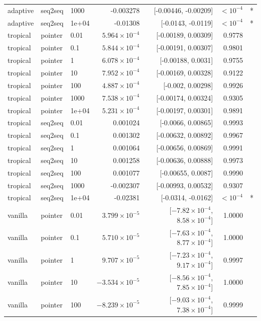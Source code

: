 \documentclass[10pt]{article}
\begin{document}
{\begin{longtable}{lllrrrl}
adaptive & seq2seq & 1000 & -0.003278 & [-0.00446, -0.00209] & $<10^{-4}$ & *\\
adaptive & seq2seq & 1e+04 & -0.01308 & [-0.0143, -0.0119] & $<10^{-4}$ & *\\
tropical & pointer & 0.01 & $5.964\times10^{-4}$ & [-0.00189, 0.00309] & 0.9778 & \\
tropical & pointer & 0.1 & $5.844\times10^{-4}$ & [-0.00191, 0.00307] & 0.9801 & \\
tropical & pointer & 1 & $6.078\times10^{-4}$ & [-0.00188, 0.0031] & 0.9755 & \\
tropical & pointer & 10 & $7.952\times10^{-4}$ & [-0.00169, 0.00328] & 0.9122 & \\
tropical & pointer & 100 & $4.887\times10^{-4}$ & [-0.002, 0.00298] & 0.9926 & \\
tropical & pointer & 1000 & $7.538\times10^{-4}$ & [-0.00174, 0.00324] & 0.9305 & \\
tropical & pointer & 1e+04 & $5.231\times10^{-4}$ & [-0.00197, 0.00301] & 0.9891 & \\
tropical & seq2seq & 0.01 & 0.001024 & [-0.0066, 0.00865] & 0.9993 & \\
tropical & seq2seq & 0.1 & 0.001302 & [-0.00632, 0.00892] & 0.9967 & \\
tropical & seq2seq & 1 & 0.001064 & [-0.00656, 0.00869] & 0.9991 & \\
tropical & seq2seq & 10 & 0.001258 & [-0.00636, 0.00888] & 0.9973 & \\
tropical & seq2seq & 100 & 0.001077 & [-0.00655, 0.0087] & 0.9990 & \\
tropical & seq2seq & 1000 & -0.002307 & [-0.00993, 0.00532] & 0.9307 & \\
tropical & seq2seq & 1e+04 & -0.02381 & [-0.0314, -0.0162] & $<10^{-4}$ & *\\
vanilla & pointer & 0.01 & $3.799\times10^{-5}$ & [$-7.82\times10^{-4}$, $8.58\times10^{-4}$] & 1.0000 & \\
vanilla & pointer & 0.1 & $5.710\times10^{-5}$ & [$-7.63\times10^{-4}$, $8.77\times10^{-4}$] & 1.0000 & \\
vanilla & pointer & 1 & $9.707\times10^{-5}$ & [$-7.23\times10^{-4}$, $9.17\times10^{-4}$] & 0.9997 & \\
vanilla & pointer & 10 & $-3.534\times10^{-5}$ & [$-8.56\times10^{-4}$, $7.85\times10^{-4}$] & 1.0000 & \\
vanilla & pointer & 100 & $-8.239\times10^{-5}$ & [$-9.03\times10^{-4}$, $7.38\times10^{-4}$] & 0.9999 & \\

\end{longtable}}
\end{document}
